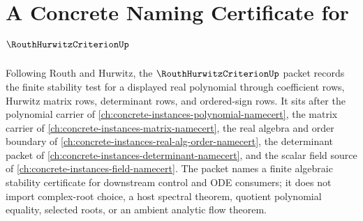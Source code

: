 \chapter{A Concrete Naming Certificate for $\RouthHurwitzCriterionUp$}
\label{ch:concrete-instances-routh-hurwitz-criterion-namecert}

Following Routh and Hurwitz, the $\RouthHurwitzCriterionUp$ packet records the finite stability test for a displayed real polynomial through coefficient rows, Hurwitz matrix rows, determinant rows, and ordered-sign rows. It sits after the polynomial carrier of \autoref{ch:concrete-instances-polynomial-namecert}, the matrix carrier of \autoref{ch:concrete-instances-matrix-namecert}, the real algebra and order boundary of \autoref{ch:concrete-instances-real-alg-order-namecert}, the determinant packet of \autoref{ch:concrete-instances-determinant-namecert}, and the scalar field source of \autoref{ch:concrete-instances-field-namecert}. The packet names a finite algebraic stability certificate for downstream control and ODE consumers; it does not import complex-root choice, a host spectral theorem, quotient polynomial equality, selected roots, or an ambient analytic flow theorem.

